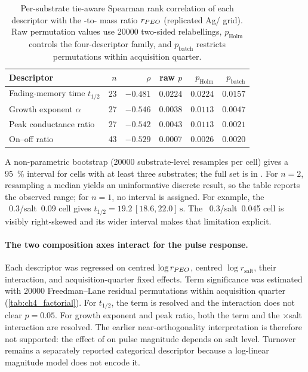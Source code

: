 \begin{table}[t]
  \centering
  \caption[Significance of the composition gradient]{Per-substrate tie-aware Spearman rank correlation of each descriptor with the \PEO{}-to-\SY{} mass ratio \(r_{PEO{}}\) (replicated Ag/ grid). Raw permutation values use \num{20000} two-sided relabellings, \(p_{\mathrm{Holm}}\) controls the four-descriptor family, and \(p_{\mathrm{batch}}\) restricts permutations within acquisition quarter.}
  \label{tab:ch4_gradient}
  \footnotesize
  \setlength{\tabcolsep}{5pt}
  \begin{tabular}{lrrrrr}
    \toprule
    Descriptor & \(n\) & \(\rho\) & raw \(p\) & \(p_{\mathrm{Holm}}\) & \(p_{\mathrm{batch}}\) \\
    \midrule
    Fading-memory time \(t_{1/2}\) & 23 & \(-0.481\) & \(0.0224\) & \(0.0224\) & \(0.0157\) \\
    Growth exponent \(\alpha\)     & 27 & \(-0.546\) & \(0.0038\) & \(0.0113\) & \(0.0047\) \\
    Peak conductance ratio          & 27 & \(-0.542\) & \(0.0043\) & \(0.0113\) & \(0.0021\) \\
    On--off ratio                   & 43 & \(-0.529\) & \(0.0007\) & \(0.0026\) & \(0.0020\) \\
    \bottomrule
  \end{tabular}
\end{table}

A non-parametric bootstrap (\num{20000} substrate-level resamples per cell) gives
a \SI{95}{\percent} interval for cells with at least three substrates; the full
set is in . For \(n=2\), resampling a median yields
an uninformative discrete result, so the table reports the observed range; for
\(n=1\), no interval is assigned. For example, the
\PEO{}~\num{0.3}/salt~\num{0.09} cell gives
\(t_{1/2}=19.2\,[18.6,22.0]\,\si{\second}\). The
\PEO{}~\num{0.3}/salt~\num{0.045} cell is visibly right-skewed and its wider
interval makes that limitation explicit.

\paragraph{The two composition axes interact for the pulse response.} Each
descriptor was regressed on centred \(\log r_{PEO{}}\), centred
\(\log r_{\mathrm{salt}}\), their interaction, and acquisition-quarter fixed
effects. Term significance was estimated with \num{20000} Freedman--Lane
residual permutations within acquisition quarter (\cref{tab:ch4_factorial}).
For \(t_{1/2}\), the \PEO{} term is resolved and the interaction does not clear
\(p=0.05\). For growth exponent and peak ratio, both the \PEO{} term and the
\PEO{}\(\times\)salt interaction are resolved. The earlier near-orthogonality
interpretation is therefore not supported: the effect of \PEO{} on pulse
magnitude depends on salt level. Turnover remains a separately reported
categorical descriptor because a log-linear magnitude model does not encode it.

